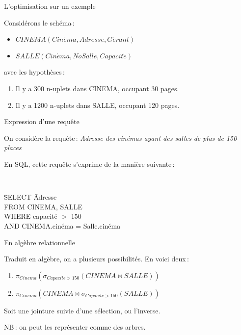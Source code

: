 \begin{tsp}{L'optimisation sur un exemple}
{
Consid\'erons le sch\'ema\,:

\begin{itemize}
  \item $CINEMA (Cin\acute{e}ma, Adresse, G\acute{e}rant)$\\
   \item $SALLE (Cin\acute{e}ma, NoSalle, Capacit\acute{e})$
\end{itemize}
avec les hypothèses\,:
\begin{enumerate}
\item Il y a 300 n-uplets dans CINEMA, occupant 30 pages.
\item Il y a 1200 n-uplets dans SALLE, occupant 120 pages.
\end{enumerate}
}
\end{tsp}

\begin{tsp}{Expression d'une requ\^ete}
{
On considère  la requ\^ete\,:
{\it Adresse des cinémas ayant des salles
de plus  de 150 places}

En SQL, cette requ\^ete s'exprime de la manière suivante\,:\\

{\tt
\begin{tabbing}
\=SELECT \=Adresse\\
\>FROM   \>CINEMA, SALLE\\
\>WHERE  \>capacité $>$ 150\\
\> AND   \> CINEMA.cinéma = Salle.cinéma
\end{tabbing}
}
}
\end{tsp}

\begin{tsp}{En algèbre relationnelle}
{
Traduit en algèbre, on a plusieurs possibilit\'es. En voici deux\,:
\begin{enumerate}
\item    $ \pi_{Cinema} (\sigma_{Capacite > 150}
        (CINEMA \Join SALLE))$
\item $ \pi_{Cinema}(CINEMA \Join
    \sigma_{Capacite>150}(SALLE))$
\end{enumerate}

Soit une jointure suivie d'une s\'election, ou l'inverse.\\
\vspace*{0.4cm}

NB\,: on peut les représenter comme des arbres.
}
\end{tsp}


